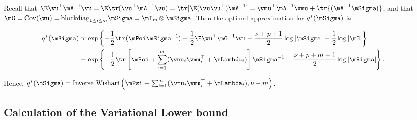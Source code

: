 Recall that
$\E \vu^\top \mA^{-1} \vu = \E \tr(\vu^\top \mA^{-1} \vu) = \tr [\E (\vu \vu^\top) \mA^{-1}] = \vmu^\top \mA^{-1} \vmu + \tr{(\mA^{-1} \mSigma)}$,
and that $\mG = \text{Cov}(\vu) = \text{blockdiag}_{1 \leq i \leq m} \mSigma = \mI_m \otimes \mSigma.$ Then the
optimal approximation for $q^*(\mSigma)$ is

\begin{align*}
	q^*(\mSigma) & \propto \exp \left \{ -\frac{1}{2} \tr (\mPsi \mSigma^{-1}) - \frac{1}{2} \E \vu^\top \mG^{-1} \vu               
	- \frac{\nu + p + 1}{2} \log |\mSigma| - \frac{1}{2} \log |\mG| \right \} \\
	             & =\exp \left \{ -\frac{1}{2} \tr \left[\mPsi + \sum_{i=1}^m (\vmu_i \vmu_i^\top + \mLambda_i) \right] \mSigma^{-1}
	- \frac{\nu + p + m + 1}{2} \log |\mSigma| \right \}.
\end{align*}

\noindent Hence, $q^*(\mSigma) = \text{Inverse Wishart} \left( \mPsi + \sum_{i=1}^m (\vmu_i \vmu_i^\top + \mLambda_i), \nu + m \right)$.


\subsection{Calculation of the Variational Lower bound}
	
